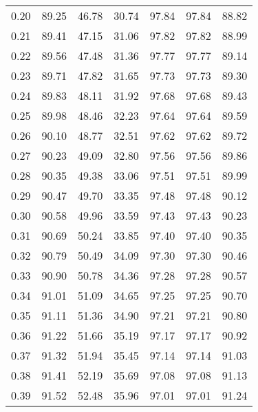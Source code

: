 \begin{tabular}{|c|c|c|c|c|c|c|}
      0.20 &     89.25 &     46.78 &      30.74 &   97.84 &      97.84 &         88.82 \\
      0.21 &     89.41 &     47.15 &      31.06 &   97.82 &      97.82 &         88.99 \\
      0.22 &     89.56 &     47.48 &      31.36 &   97.77 &      97.77 &         89.14 \\
      0.23 &     89.71 &     47.82 &      31.65 &   97.73 &      97.73 &         89.30 \\
      0.24 &     89.83 &     48.11 &      31.92 &   97.68 &      97.68 &         89.43 \\
      0.25 &     89.98 &     48.46 &      32.23 &   97.64 &      97.64 &         89.59 \\
      0.26 &     90.10 &     48.77 &      32.51 &   97.62 &      97.62 &         89.72 \\
      0.27 &     90.23 &     49.09 &      32.80 &   97.56 &      97.56 &         89.86 \\
      0.28 &     90.35 &     49.38 &      33.06 &   97.51 &      97.51 &         89.99 \\
      0.29 &     90.47 &     49.70 &      33.35 &   97.48 &      97.48 &         90.12 \\
      0.30 &     90.58 &     49.96 &      33.59 &   97.43 &      97.43 &         90.23 \\
      0.31 &     90.69 &     50.24 &      33.85 &   97.40 &      97.40 &         90.35 \\
      0.32 &     90.79 &     50.49 &      34.09 &   97.30 &      97.30 &         90.46 \\
      0.33 &     90.90 &     50.78 &      34.36 &   97.28 &      97.28 &         90.57 \\
      0.34 &     91.01 &     51.09 &      34.65 &   97.25 &      97.25 &         90.70 \\
      0.35 &     91.11 &     51.36 &      34.90 &   97.21 &      97.21 &         90.80 \\
      0.36 &     91.22 &     51.66 &      35.19 &   97.17 &      97.17 &         90.92 \\
      0.37 &     91.32 &     51.94 &      35.45 &   97.14 &      97.14 &         91.03 \\
      0.38 &     91.41 &     52.19 &      35.69 &   97.08 &      97.08 &         91.13 \\
      0.39 &     91.52 &     52.48 &      35.96 &   97.01 &      97.01 &         91.24 \\

\end{tabular}
